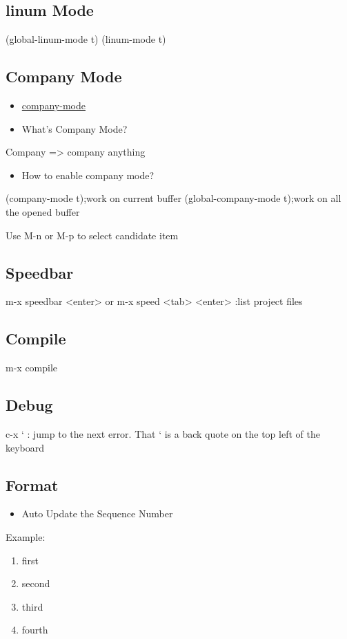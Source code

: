 \documentclass[11pt]{article}
\begin{document}
\subsection{linum Mode}
\label{sec:orga5d2bf8}
(global-linum-mode t)
(linum-mode t)

\subsection{Company Mode}
\label{sec:org9b1370c}
\begin{itemize}
\item \href{http://company-mode.github.io/}{company-mode}
\item What's Company Mode?
\end{itemize}
Company => company anything
\begin{itemize}
\item How to enable company mode?
\end{itemize}

(company-mode t);work on current buffer
(global-company-mode t);work on all the opened buffer

Use M-n or M-p to select candidate item
\subsection{Speedbar}
\label{sec:org2ecdcbf}
m-x speedbar <enter> or m-x speed <tab> <enter> :list project files
\subsection{Compile}
\label{sec:orgbd602fd}
m-x compile
\subsection{Debug}
\label{sec:org05e9f29}
c-x ` : jump to the next error. That ` is a back quote on the top left of the keyboard
\subsection{Format}
\label{sec:org4bcbb1b}
\begin{itemize}
\item Auto Update the Sequence Number
\end{itemize}
Example:
\begin{enumerate}
\item first
\item second
\item third
\item fourth
\end{enumerate}
\end{document}
